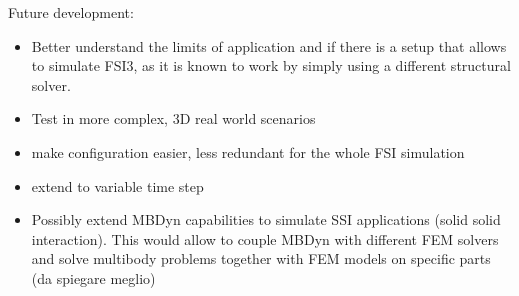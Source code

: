 Future development:
\begin{itemize}
	\item Better understand the limits of application and if there is a setup that allows to simulate FSI3, as it is known to work by simply using a different structural solver.
	\item Test in more complex, 3D real world scenarios
	\item make configuration easier, less redundant for the whole FSI simulation
	\item extend to variable time step
	\item Possibly extend MBDyn capabilities to simulate SSI applications (solid solid interaction). This would allow to couple MBDyn with different FEM solvers and solve multibody problems together with FEM models on specific parts (da spiegare meglio)
\end{itemize}









